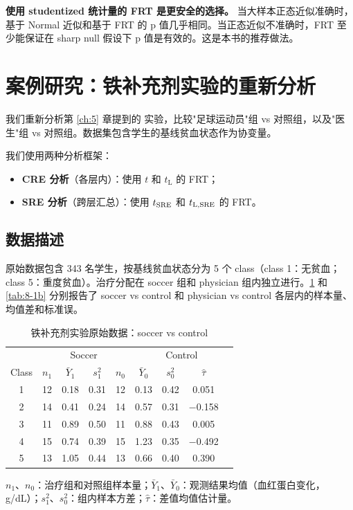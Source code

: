 \textbf{使用 studentized 统计量的 FRT 是更安全的选择。} 当大样本正态近似准确时，基于 Normal 近似和基于 FRT 的 p 值几乎相同。当正态近似不准确时，FRT 至少能保证在 sharp null 假设下 p 值是有效的。这是本书的推荐做法。

\section{案例研究：铁补充剂实验的重新分析}
\label{sec:8-case-study}

我们重新分析第 \ref{ch:5} 章提到的 \citet{Chong:2016} 实验，比较"足球运动员"组 vs 对照组，以及"医生"组 vs 对照组。数据集包含学生的基线贫血状态作为协变量。

我们使用两种分析框架：
\begin{itemize}
  \item \textbf{CRE 分析}（各层内）：使用 $t$ 和 $t_\mathrm{L}$ 的 FRT；
  \item \textbf{SRE 分析}（跨层汇总）：使用 $t_{\text{SRE}}$ 和 $t_{\mathrm{L},\text{SRE}}$ 的 FRT。
\end{itemize}

\subsection{数据描述}\label{sec:8-data-description}

原始数据包含 343 名学生，按基线贫血状态分为 5 个 class（class 1：无贫血；class 5：重度贫血）。治疗分配在 soccer 组和 physician 组内独立进行。\cref{tab:8-1a} 和 \cref{tab:8-1b} 分别报告了 soccer vs control 和 physician vs control 各层内的样本量、均值差和标准误。

\begin{table}[htbp]
\caption{铁补充剂实验原始数据：soccer vs control}
\label{tab:8-1a}
\centering
\begin{tabular}{c|cccc|cccc}
\toprule
 & \multicolumn{4}{c}{Soccer} & \multicolumn{4}{c}{Control} \\
Class & $n_1$ & $\bar{Y}_1$ & $s_1^2$ & $n_0$ & $\bar{Y}_0$ & $s_0^2$ & $\hat\tau$ \\ \midrule
1 & 12 & 0.18 & 0.31 & 12 & 0.13 & 0.42 & 0.051 \\
2 & 14 & 0.41 & 0.24 & 14 & 0.57 & 0.31 & $-$0.158 \\
3 & 11 & 0.89 & 0.50 & 11 & 0.88 & 0.43 & 0.005 \\
4 & 15 & 0.74 & 0.39 & 15 & 1.23 & 0.35 & $-$0.492 \\
5 & 13 & 1.05 & 0.44 & 13 & 0.66 & 0.40 & 0.390 \\ \bottomrule
\end{tabular}
\par\medskip\small
$n_1$、$n_0$：治疗组和对照组样本量；$\bar{Y}_1$、$\bar{Y}_0$：观测结果均值（血红蛋白变化，g/dL）；$s_1^2$、$s_0^2$：组内样本方差；$\hat\tau$：差值均值估计量。
\end{table}

